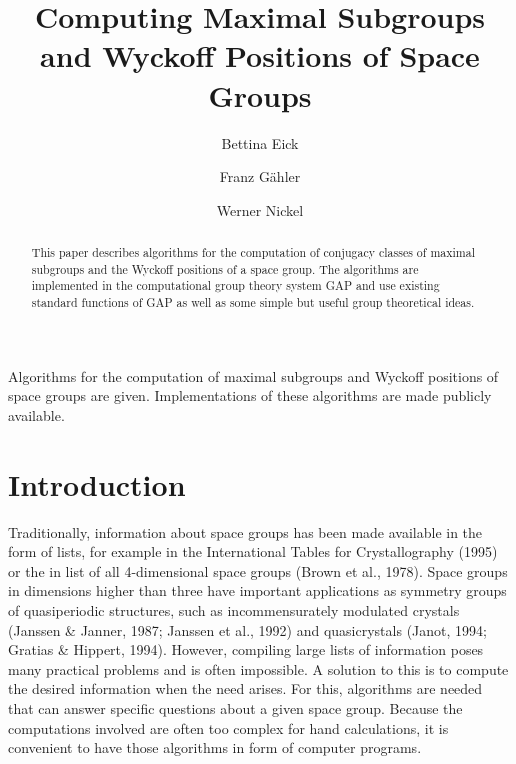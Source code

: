 \documentclass[12pt]{amsart}
\newcommand{\GAP}{{\sf GAP}}
\begin{document}
\title[Maximal Subgroups and Wyckoff Positions]
{Computing Maximal Subgroups and Wyckoff Positions of Space Groups}
\author{Bettina Eick}
\address{Lehrstuhl D f\"ur Mathematik,
         RWTH Aachen, D-52056 Aachen, Germany} 
\author{Franz G\"ahler}
\address{Centre de Physique Th\'eorique, Ecole Polytechnique,
         F-91128 Palaiseau, France}
\author{Werner Nickel}
\address{School of Mathematical and Computational Sciences, 
         University of St~Andrews, St~Andrews, Fife KY16 9SS, Scotland}

\subjclass{}

\begin{abstract}
This   paper describes algorithms  for the  computation of conjugacy
classes of  maximal subgroups  and the Wyckoff positions of a space
group.  The algorithms are implemented in  the computational group  
theory system  {\GAP} and use  existing standard functions of {\GAP}  
as well as some  simple but useful group theoretical ideas.
\end{abstract}

\maketitle

\bigskip

 Algorithms for the computation of maximal 
subgroups and Wyckoff positions of space groups are given. 
Implementations of these algorithms are made publicly available.

\bigskip

\section{Introduction}
\label{sintro}

Traditionally, information about space groups has been made available
in the form of lists, for example in the International Tables for
Crystallography (1995) or the in list of all 4-dimensional space
groups (Brown et al., 1978). Space groups in dimensions higher than
three have important applications as symmetry groups of quasiperiodic
structures, such as incommensurately modulated crystals (Janssen \&
Janner, 1987; Janssen et al., 1992) and quasicrystals (Janot, 1994;
Gratias \& Hippert, 1994).  However, compiling large lists of
information poses many practical problems and is often impossible.  A
solution to this is to compute the desired information when the need
arises.  For this, algorithms are needed that can answer specific
questions about a given space group.  Because the computations
involved are often too complex for hand calculations, it is convenient
to have those algorithms in form of computer programs.
\end{document}
